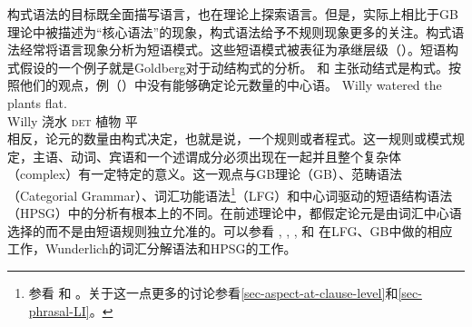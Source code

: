 \noindent
构式语法的目标既全面描写语言，也在理论上探索语言。但是，实际上相比于GB理论中被描述为“核心语法”的现象，构式语法给予不规则现象更多的关注。构式语法经常将语言现象分析为短语模式。这些短语模式被表征为承继层级（\egc \citealp{Croft2001a,Goldberg2003a}）。短语构式假设的一个例子就是Goldberg对于动结构式的分析。 \citet{Goldberg95a}和 \citet{GJ2004a}主张动结式是构式。按照他们的观点，例（）中没有能够确定论元数量的中心语。
%
\ea
\gll Willy watered the plants flat.\\
	 Willy 浇水 \textsc{det} 植物 平\\
\z
相反，论元的数量由构式决定，也就是说，一个规则或者程式。这一规则或模式规定，主语、动词、宾语和一个述谓成分必须出现在一起并且整个复杂体（complex）有一定特定的意义。这一观点与GB理论\indexgbc（GB）、范畴语法\indexcgc（Categorial Grammar）、词汇功能语法\footnote{参看 和 。关于这一点更多的讨论参看\ref{sec-aspect-at-clause-level}和\ref{sec-phrasal-LI}。%
}\indexlfgc（LFG）和中心词驱动的短语结构语法\indexhpsgc（HPSG）中的分析有根本上的不同。在前述理论中，都假定论元是由词汇中心语选择的而不是由短语规则独立允准的。可以参看 ,  ,  ,  和 在LFG、GB中做的相应工作，Wunderlich的词汇分解语法和HPSG的工作。

